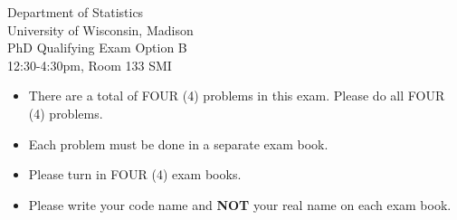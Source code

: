 \documentclass[12pt]{article}
\begin{document}
\vspace*{3cm}

 \Large
\begin{center}
Department of Statistics \\
University of Wisconsin, Madison\\
PhD Qualifying Exam Option B\\
12:30-4:30pm, Room 133 SMI \\
\end{center}

\normalsize

\begin{itemize}
\item There are a total of FOUR (4) problems in this exam. Please do
all FOUR (4) problems.

\item Each problem must be done in a separate exam book.

\item Please turn in FOUR (4) exam books.

\item Please write your code name and \textbf{NOT} your real name on
each exam book.

\end{itemize}

\clearpage
\end{document}
